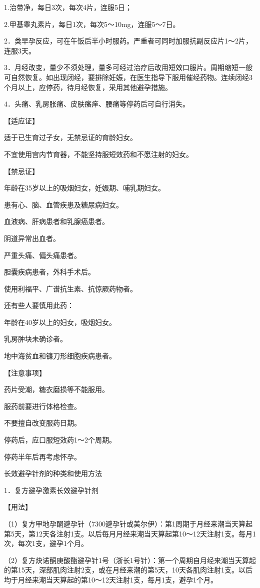 \documentclass[12pt,UTF8,openany]{ctexbook}
\begin{document}
1.治带净，每日3次，每次4片，连服5日；

2.甲基睾丸素片，每日1次，每次5～10mg，连服5～7日。

2．类早孕反应，可在午饭后半小时服药。严重者可同时加服抗副反应片1～2片，连服3天。

3．月经改变，量少不须处理，量多可经过治疗后改用短效口服片。周期缩短一般可自然恢复。如出现闭经，要排除妊娠，在医生指导下服用催经药物。连续闭经3个月以上，应停药，待月经恢复，采用其他避孕措施。

4．头痛、乳房胀痛、皮肤瘙痒、腰痛等停药后可自行消失。

【适应证】

适于已生育过子女，无禁忌证的育龄妇女。

不宜使用宫内节育器，不能坚持服短效药和不愿注射的妇女。

【禁忌证】

年龄在35岁以上的吸烟妇女，妊娠期、哺乳期妇女。

患有心、脑、血管疾患及糖尿病妇女。

血液病、肝病患者和乳腺癌患者。

阴道异常出血者。

严重头痛、偏头痛患者。

胆囊疾病患者，外科手术后。

使用利福平、广谱抗生素、抗惊厥药物者。

还有些人要慎用此药：

年龄在40岁以上的妇女，吸烟妇女。

乳房肿块未确诊者。

地中海贫血和镰刀形细胞疾病患者。

【注意事项】

药片受潮，糖衣磨损等不能服用。

服药前要进行体格检查。

不要擅自改变服药日期。

停药后，应口服短效药1～2个周期。

停药半年后再考虑怀孕。





长效避孕针剂的种类和使用方法


1．复方避孕激素长效避孕针剂

【用法】

（1）复方甲地孕酮避孕针（7300避孕针或美尔伊）：第1周期于月经来潮当天算起第5天，第12天各注射1支。以后每月月经来潮当天算起第10～12天注射1支。每月1次，每次1支，避孕1个月。

（2）复方炔诺酮庚酸酯避孕针1号（浙长1号针）：第一个周期自月经来潮当天算起的第15天，深部肌肉注射2支，或在月经来潮的第5天，10天各肌肉注射1支。以后均于月经来潮当天算起的第10～12天注射1支，每月1支，避孕1个月。
\end{document}
